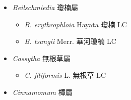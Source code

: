
  \begin{itemize}
 \item[] \textit{Beilschmiedia} 瓊楠屬
                                
  \begin{itemize}
        \item[] \textit{B. erythrophloia} Hayata  瓊楠   LC
        \item[] \textit{B. tsangii} Merr.  華河瓊楠   LC
  \end{itemize}
 \item[] \textit{Cassytha} 無根草屬
                                
  \begin{itemize}
        \item[] \textit{C. filiformis} L.  無根草   LC
  \end{itemize}
 \item[] \textit{Cinnamomum} 樟屬
                                

\end{itemize}
